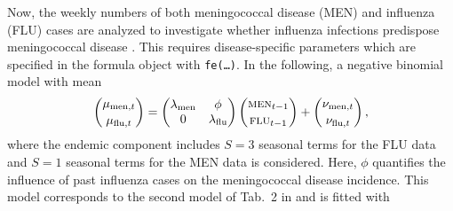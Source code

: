 \documentclass[a4paper,11pt]{article}
\newcommand{\code}[1]{\texttt{#1}}
\begin{document}
Now, the weekly numbers of both meningococcal disease (\textsc{MEN}) and 
influenza (\textsc{FLU}) cases are analyzed to investigate whether influenza 
infections predispose meningococcal disease \citep[cf.~Tab.~2 in][]{paul-etal-2008}.
This requires disease-specific parameters which are specified in the formula 
object with \code{fe(\ldots)}.
In the following, a negative binomial model with mean
\begin{align*}
  \binom{\mu_{\text{men},t}} {\mu_{\text{flu},t}}=
    \begin{pmatrix}
      \lambda_\text{men} & \phi \\ 
      0 & \lambda_\text{flu} \\
    \end{pmatrix} \binom{\text{\sc men}_{t-1}}{\text{\sc flu}_{t-1}}
    + \binom{\nu_{\text{men},t}}{\nu_{\text{flu},t}}\,,
\end{align*}
where the endemic component includes $S=3$ seasonal terms for the \textsc{FLU}
data and $S=1$ seasonal terms for the \textsc{MEN} data is considered. 
Here, $\phi$ quantifies the influence of past influenza cases on the meningococcal
disease incidence. 
This model corresponds to the second model of Tab.~2 in \cite{paul-etal-2008}
and is fitted with
\end{document}
